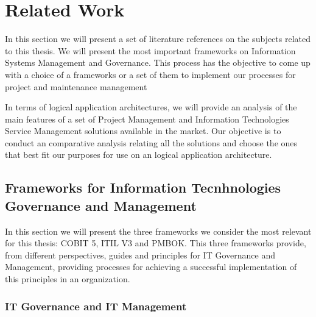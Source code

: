 
% 
% 

\section{Related Work}

In this section we will present a set of literature references on the subjects related to this thesis. We will present the most important frameworks on Information Systems Management and Governance. This process has the objective to come up with a choice of a frameworks or a set of them to implement our processes for project and maintenance management\par
In terms of logical application architectures, we will provide an analysis of the main features of a set of Project Management and Information Technologies Service Management solutions available in the market. Our objective is to conduct an comparative analysis relating all the solutions and choose the ones that best fit our purposes for use on an logical application architecture.  

\subsection{Frameworks for Information Tecnhnologies Governance and Management}

In this section we will present the three frameworks we consider the most relevant for this thesis: COBIT 5, ITIL V3 and PMBOK. This three frameworks provide, from different perspectives, guides and principles for IT Governance and Management, providing processes for achieving a successful implementation of this principles in an organization.\par


\subsubsection{IT Governance and IT Management}

